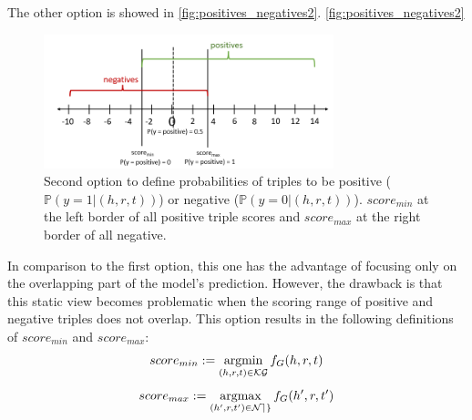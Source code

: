 The other option is showed in \autoref{fig:positives_negatives2}.
\autoref{fig:positives_negatives2}
\begin{figure}[t]
  \centering
    \includegraphics[width=0.75\textwidth]{figures/positives_negatives2.PNG}
  \caption{Second option to define probabilities of triples to be positive ($\mathds{P}(y = 1 | (h,r,t))$) or negative ($\mathds{P}(y = 0 | (h,r,t))$). 
  $score_{min}$ at the left border of all positive triple scores and $score_{max}$ at the right border of all negative.}
  \label{fig:positives_negatives2}
\end{figure}
In comparison to the first option, this one has the advantage of focusing only on the overlapping part of the model's prediction.
However, the drawback is that this static view becomes problematic when the scoring range of positive and negative triples does not overlap.
This option results in the following definitions of $score_{min}$ and $score_{max}$:
\begin{equation} \label{eqn:opt2_score_min}
    score_{min} := \operatorname*{argmin}_{(h,r,t) \in \mathcal{KG}}{f_G(h,r,t)}
\end{equation}
\begin{equation} \label{eqn:opt2_score_max}
    score_{max} := \operatorname*{argmax}_{(h',r,t') \in \mathcal{Neg}}{f_G(h',r,t')}
\end{equation}

